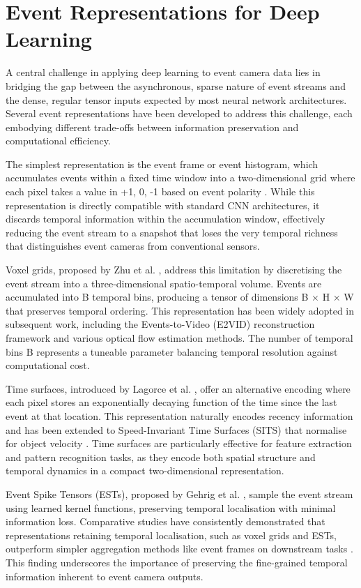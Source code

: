 \documentclass[11pt, a4paper]{report}
\begin{document}
\section{Event Representations for Deep Learning}
A central challenge in applying deep learning to event camera data lies in bridging the gap between the asynchronous, sparse nature of event streams and the dense, regular tensor inputs expected by most neural network architectures. Several event representations have been developed to address this challenge, each embodying different trade-offs between information preservation and computational efficiency. 

The simplest representation is the event frame or event histogram, which accumulates events within a fixed time window into a two-dimensional grid where each pixel takes a value in {+1, 0, -1} based on event polarity \cite{gallego2020event}. While this representation is directly compatible with standard CNN architectures, it discards temporal information within the accumulation window, effectively reducing the event stream to a snapshot that loses the very temporal richness that distinguishes event cameras from conventional sensors. 

Voxel grids, proposed by Zhu et al. \cite{zhu2019unsupervised}, address this limitation by discretising the event stream into a three-dimensional spatio-temporal volume. Events are accumulated into B temporal bins, producing a tensor of dimensions B × H × W that preserves temporal ordering. This representation has been widely adopted in subsequent work, including the Events-to-Video (E2VID) reconstruction framework \cite{rebecq2019e2vid} and various optical flow estimation methods. The number of temporal bins B represents a tuneable parameter balancing temporal resolution against computational cost. 

Time surfaces, introduced by Lagorce et al. \cite{lagorce2017hots}, offer an alternative encoding where each pixel stores an exponentially decaying function of the time since the last event at that location. This representation naturally encodes recency information and has been extended to Speed-Invariant Time Surfaces (SITS) that normalise for object velocity \cite{manderscheid2019speed}. Time surfaces are particularly effective for feature extraction and pattern recognition tasks, as they encode both spatial structure and temporal dynamics in a compact two-dimensional representation. 

Event Spike Tensors (ESTs), proposed by Gehrig et al. \cite{gehrig2019end}, sample the event stream using learned kernel functions, preserving temporal localisation with minimal information loss. Comparative studies have consistently demonstrated that representations retaining temporal localisation, such as voxel grids and ESTs, outperform simpler aggregation methods like event frames on downstream tasks \cite{gehrig2019end}. This finding underscores the importance of preserving the fine-grained temporal information inherent to event camera outputs. 
\end{document}
